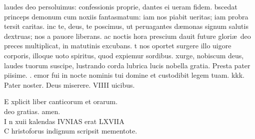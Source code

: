 \documentclass[letter,12pt]{book}
\makeatletter
\newcommand*\zallmancaps{\usefont{U}{Zallman}{xl}{n}}
\DeclareRobustCommand{\Vbar}{\vers@resp{-0.1em}{V}}
\newcommand{\vers@resp@sym}{\raisebox{0.2ex}{\rotatebox[origin=c]{-20}{$\m@th\rceil$}}}
\newcommand{\vers@resp}[2]{%
  {\ooalign{\hidewidth\kern#1\vers@resp@sym\hidewidth\cr#2\cr}}%
}%
\def\V{\color{Red} \Vbar . \color{black}}
\makeatother
\begin{document}
laudes deo persoluimus:
confessionis proprie,
dantes ei ueram fidem.
bscedat princeps demonum
cum noxiis
fantasmatum:
iam nos piabit ueritas;
iam probra tersit caritas.
inc te, deus, te poscimus,
ut peruagantes d\ae monas
signum salutis dextruas; %
nos a pauore liberans.
ac noctis hora prescium
dauit future glori\ae \ 
deo preces multiplicat,
in matutinis excubans.
t nos oportet surgere
illo uigore corporis,
illoque uoto spiritus,
quod expiemur sordibus.
xurge, nobiscum deus,
laudes tuorum suscipe,
lustrando corda lubrica
lucis nobella gratia. {\color{Red} P}resta pater piisime.
\newline \V {\color{Red} M}emor fui in nocte nominis tui domine et custodibit legem tuam. {\color{Red} kkk. P}ater noster. {\color{Red} D}eus miserere. VIIII uicibus.
\begin{center} \color{Red}
\mdseries \large E\color{black} xplicit liber canticorum et orarum. \\
deo gratias. amen. \\
\color{Red} I\color{black} n xuii kalendas IVNIAS erat LXVIIA \\
\color{Red} C\color{black} hristoforus indignum scripsit mementote.
\end{center}




\end{document}
